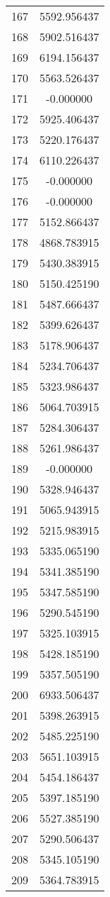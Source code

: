 \documentclass[12pt]{article}
\begin{document}
\begin{longtable}{@{}cc@{}}
167 & 5592.956437 \\
168 & 5902.516437 \\
169 & 6194.156437 \\
170 & 5563.526437 \\
171 & -0.000000 \\
172 & 5925.406437 \\
173 & 5220.176437 \\
174 & 6110.226437 \\
175 & -0.000000 \\
176 & -0.000000 \\
177 & 5152.866437 \\
178 & 4868.783915 \\
179 & 5430.383915 \\
180 & 5150.425190 \\
181 & 5487.666437 \\
182 & 5399.626437 \\
183 & 5178.906437 \\
184 & 5234.706437 \\
185 & 5323.986437 \\
186 & 5064.703915 \\
187 & 5284.306437 \\
188 & 5261.986437 \\
189 & -0.000000 \\
190 & 5328.946437 \\
191 & 5065.943915 \\
192 & 5215.983915 \\
193 & 5335.065190 \\
194 & 5341.385190 \\
195 & 5347.585190 \\
196 & 5290.545190 \\
197 & 5325.103915 \\
198 & 5428.185190 \\
199 & 5357.505190 \\
200 & 6933.506437 \\
201 & 5398.263915 \\
202 & 5485.225190 \\
203 & 5651.103915 \\
204 & 5454.186437 \\
205 & 5397.185190 \\
206 & 5527.385190 \\
207 & 5290.506437 \\
208 & 5345.105190 \\
209 & 5364.783915 \\

\end{longtable}
\end{document}
